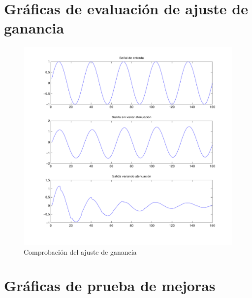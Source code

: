 \documentclass[a4paper,12pt]{article}
\begin{document}
\section{Gráficas de evaluación de ajuste de ganancia}\label{sec:resultadosajuste}
\begin{figure}[hbt]
\begin{center}
\includegraphics[width=\textwidth]{img/test_adjust.pdf} 
\caption{Comprobación del ajuste de ganancia} \label{fig:adjustgraph}
\end{center}
\end{figure}

\clearpage

\section{Gráficas de prueba de mejoras}\label{sec:resultadosmejoras}
\end{document}
